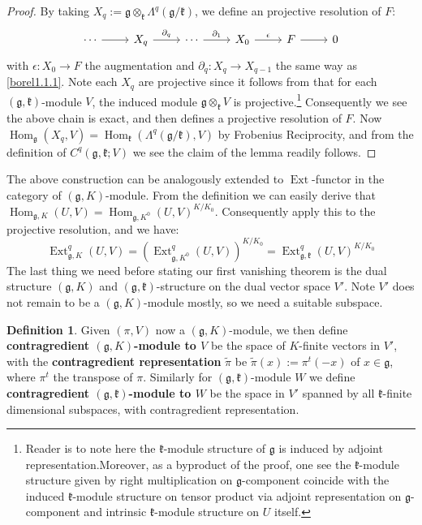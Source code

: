 \documentclass[11pt]{report}
\theoremstyle{definition}
\newtheorem{Def}{Definition}[chapter]
\theoremstyle{plain}
\DeclareMathOperator{\Ext}{Ext}
\DeclareMathOperator{\Hom}{Hom}
\renewcommand{\tilde}{\widetilde}
\newcommand{\Lie}[1]{\mathfrak{#1}}
\begin{document}
\begin{proof}
	By taking $X_q:=\Lie{g}\otimes_{\Lie{k}}\Lambda^q(\Lie{g}/\Lie{k})$, we define an projective resolution of $F$:
	\begin{equation}
	\begin{tikzcd}
	\cdots \rar &X_q\rar{\partial_q} &\cdots \rar{\partial_1}&X_0\rar{\epsilon} &F \rar &0
	\end{tikzcd}
	\end{equation}
	with $\epsilon: X_0\to F$ the augmentation and $\partial_q:X_q\to X_{q-1}$ the same way as \ref{borel1.1.1}. Note each $X_q$ are projective since it follows from \cite[Chapter~I, \S 2.4]{borel2013} that for each $(\Lie{g}, \Lie{k})$-module $V$, the induced module $\Lie{g}\otimes_\Lie{k}V$ is projective.\footnote{Reader is to note here the $\Lie{k}$-module structure of $\Lie{g}$ is induced by adjoint representation.Moreover, as a byproduct of the proof, one see the $\Lie{k}$-module structure given by right multiplication on $\Lie{g}$-component coincide with the induced $\Lie{k}$-module structure on tensor product via adjoint representation on $\Lie{g}$-component and intrinsic $\Lie{k}$-module structure on $U$ itself.} Consequently we see the above chain is exact, and then defines a projective resolution of $F$. Now $\Hom_{\Lie{g}}(X_q, V)=\Hom_{\Lie{k}}(\Lambda^q(\Lie{g}/\Lie{k}), V)$ by Frobenius Reciprocity, and from the definition of $C^q(\Lie{g}, \Lie{k};V)$ we see the claim of the lemma readily follows.
\end{proof}
The above construction can be analogously extended to $\Ext$-functor in the category of $(\Lie{g},K)$-module. From the definition we can easily derive that $\Hom_{\Lie{g},K}(U,V)=\Hom_{\Lie{g},K^0}(U,V)^{K/K_0}$. Consequently apply this to the projective resolution, and we have:
\begin{equation}
 \Ext^q_{\Lie{g}, K}(U,V)=(\Ext^q_{\Lie{g},K^0}(U,V))^{K/K_0}=\Ext^q_{\Lie{g},\Lie{k}}(U,V)^{K/K_0}
\end{equation}
The last thing we need before stating our first vanishing theorem is the dual structure $(\Lie{g},K)$ and $(\Lie{g},\Lie{k})$-structure on the dual vector space $V'$. Note $V'$ does not remain to be a $(\Lie{g}, K)$-module mostly, so we need a suitable subspace.
\begin{Def}
	Given $(\pi,V)$ now a $(\Lie{g},K)$-module, we then define \textbf{contragredient $(\Lie{g},K)$-module to $V$} be the space of $K$-finite vectors in $V'$, with the \textbf{contragredient representation} $\tilde{\pi}$ be $\tilde{\pi}(x):=\pi^t(-x)$ of $x\in \Lie{g}$, where $\pi^t$ the transpose of $\pi$. Similarly for $(\Lie{g,k})$-module $W$ we define \textbf{contragredient $(\Lie{g},\Lie{k})$-module to $W$} be the space in $V'$ spanned by all $\Lie{k}$-finite dimensional subspaces, with contragredient representation.
\end{Def}
\end{document}
